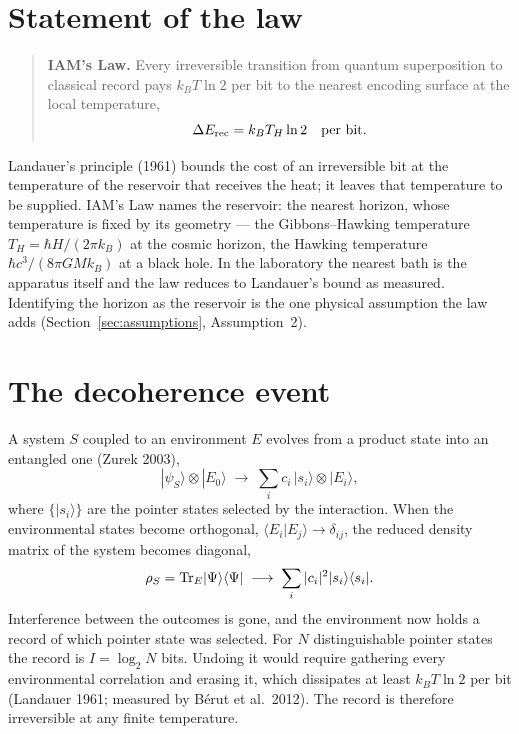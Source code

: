 \section{Statement of the law}
\begin{quote}\textbf{IAM's Law.} Every irreversible transition from quantum superposition to classical record pays $k_BT\ln2$ per bit to the nearest
encoding surface at the local temperature,
\begin{equation}
\Delta E_{\rm rec}=k_BT_H\ln2\quad\text{per bit}. \label{eq:law}
\end{equation}
\end{quote}
Landauer's principle (1961) bounds the cost of an irreversible bit at the temperature of the reservoir that receives the heat; it leaves that temperature
to be supplied. IAM's Law names the reservoir: the nearest horizon, whose temperature is fixed by its geometry --- the Gibbons--Hawking temperature
$T_H=\hbar H/(2\pi k_B)$ at the cosmic horizon, the Hawking temperature $\hbar c^3/(8\pi GMk_B)$ at a black hole. In the laboratory the nearest bath is the
apparatus itself and the law reduces to Landauer's bound as measured. Identifying the horizon as the reservoir is the one physical assumption the law adds
(Section~\ref{sec:assumptions}, Assumption~2).

\section{The decoherence event}
A system $S$ coupled to an environment $E$ evolves from a product state into an entangled one (Zurek 2003),
\begin{equation}
|\psi_S\rangle\otimes|E_0\rangle\;\longrightarrow\;\sum_ic_i\,|s_i\rangle\otimes|E_i\rangle,
\end{equation}
where $\{|s_i\rangle\}$ are the pointer states selected by the interaction. When the environmental states become orthogonal, $\langle E_i|E_j\rangle\to\delta_{ij}$,
the reduced density matrix of the system becomes diagonal,
\begin{equation}
\rho_S={\rm Tr}_E|\Psi\rangle\langle\Psi|\;\longrightarrow\;\sum_i|c_i|^2|s_i\rangle\langle s_i|.
\end{equation}
Interference between the outcomes is gone, and the environment now holds a record of which pointer state was selected. For $N$ distinguishable pointer
states the record is $I=\log_2N$ bits. Undoing it would require gathering every environmental correlation and erasing it, which dissipates at least
$k_BT\ln2$ per bit (Landauer 1961; measured by B\'erut et al.\ 2012). The record is therefore irreversible at any finite temperature.

